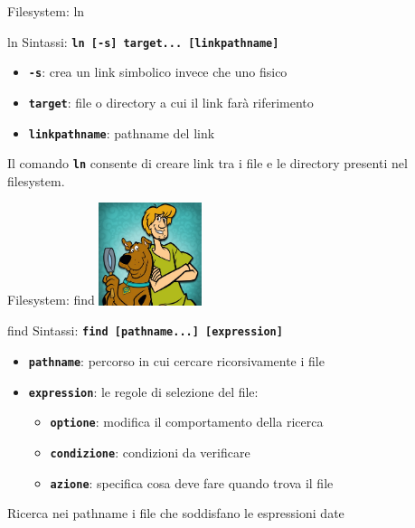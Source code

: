 \documentclass{beamer}
\begin{document}
    \begin{frame}{Filesystem: ln}
        \begin{block}{ln}
            \small
            Sintassi: \texttt{\textbf{ln [-s] target... [linkpathname]}}

            \begin{itemize}
                \item \texttt{\textbf{-s}}: crea un link simbolico invece che uno fisico
                \item \texttt{\textbf{target}}: file o directory a cui il link farà riferimento
                \item \texttt{\textbf{linkpathname}}: pathname del link
            \end{itemize}

            Il comando \texttt{\textbf{ln}} consente di creare link tra i file e le directory presenti nel filesystem.
        \end{block}
    \end{frame}

    \begin{frame}{Filesystem: find}
        \centering
        \includegraphics[height=3cm, keepaspectratio]{images/scooby.jpg}

        \begin{block}{find}
            \small
            Sintassi: \texttt{\textbf{find [pathname...] [expression]}}

            \begin{itemize}
                \item \texttt{\textbf{pathname}}: percorso in cui cercare ricorsivamente i file
                \item \texttt{\textbf{expression}}: le regole di selezione del file:
                \begin{itemize}
                    \item \texttt{\textbf{optione}}: modifica il comportamento della ricerca
                    \item \texttt{\textbf{condizione}}: condizioni da verificare
                    \item \texttt{\textbf{azione}}: specifica cosa deve fare quando trova il file
                \end{itemize}
            \end{itemize}

            Ricerca nei pathname i file che soddisfano le espressioni date
        \end{block}
    \end{frame}
\end{document}
